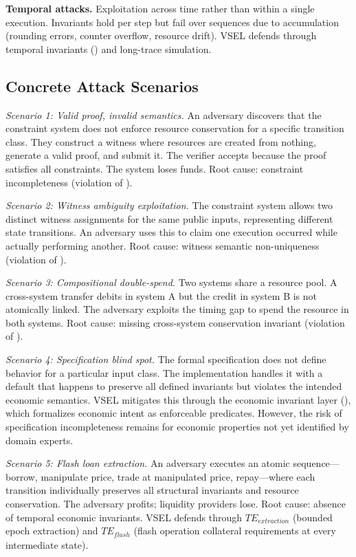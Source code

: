\documentclass[11pt,a4paper]{article}
\theoremstyle{definition}
\begin{document}
\noindent\textbf{Temporal attacks.} Exploitation across time rather than within a single execution. Invariants hold per step but fail over sequences due to accumulation (rounding errors, counter overflow, resource drift). VSEL defends through temporal invariants () and long-trace simulation.

\subsection{Concrete Attack Scenarios}
\label{subsec:attack-scenarios}

\noindent\emph{Scenario 1: Valid proof, invalid semantics.} An adversary discovers that the constraint system does not enforce resource conservation for a specific transition class. They construct a witness where resources are created from nothing, generate a valid proof, and submit it. The verifier accepts because the proof satisfies all constraints. The system loses funds. Root cause: constraint incompleteness (violation of ).

\noindent\emph{Scenario 2: Witness ambiguity exploitation.} The constraint system allows two distinct witness assignments for the same public inputs, representing different state transitions. An adversary uses this to claim one execution occurred while actually performing another. Root cause: witness semantic non-uniqueness (violation of ).

\noindent\emph{Scenario 3: Compositional double-spend.} Two systems share a resource pool. A cross-system transfer debits in system A but the credit in system B is not atomically linked. The adversary exploits the timing gap to spend the resource in both systems. Root cause: missing cross-system conservation invariant (violation of ).

\noindent\emph{Scenario 4: Specification blind spot.} The formal specification does not define behavior for a particular input class. The implementation handles it with a default that happens to preserve all defined invariants but violates the intended economic semantics. VSEL mitigates this through the economic invariant layer (), which formalizes economic intent as enforceable predicates. However, the risk of specification incompleteness remains for economic properties not yet identified by domain experts.

\noindent\emph{Scenario 5: Flash loan extraction.} An adversary executes an atomic sequence---borrow, manipulate price, trade at manipulated price, repay---where each transition individually preserves all structural invariants and resource conservation. The adversary profits; liquidity providers lose. Root cause: absence of temporal economic invariants. VSEL defends through $\mathit{TE}_{\mathit{extraction}}$ (bounded epoch extraction) and $\mathit{TE}_{\mathit{flash}}$ (flash operation collateral requirements at every intermediate state).
\end{document}

